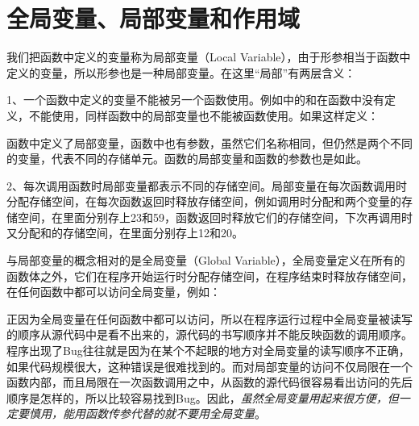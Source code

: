\section{全局变量、局部变量和作用域}
%
我们把函数中定义的变量称为局部变量（Local Variable），由于形参相当于函数中定义的变量，所以形参也是一种局部变量。在这里“局部”有两层含义：



1、一个函数中定义的变量不能被另一个函数使用。例如中的和在函数中没有定义，不能使用，同样函数中的局部变量也不能被函数使用。如果这样定义：




函数中定义了局部变量，函数中也有参数，虽然它们名称相同，但仍然是两个不同的变量，代表不同的存储单元。函数的局部变量和函数的参数也是如此。



2、每次调用函数时局部变量都表示不同的存储空间。局部变量在每次函数调用时分配存储空间，在每次函数返回时释放存储空间，例如调用时分配和两个变量的存储空间，在里面分别存上23和59，函数返回时释放它们的存储空间，下次再调用时又分配和的存储空间，在里面分别存上12和20。



与局部变量的概念相对的是全局变量（Global Variable），全局变量定义在所有的函数体之外，它们在程序开始运行时分配存储空间，在程序结束时释放存储空间，在任何函数中都可以访问全局变量，例如：





正因为全局变量在任何函数中都可以访问，所以在程序运行过程中全局变量被读写的顺序从源代码中是看不出来的，源代码的书写顺序并不能反映函数的调用顺序。程序出现了Bug往往就是因为在某个不起眼的地方对全局变量的读写顺序不正确，如果代码规模很大，这种错误是很难找到的。而对局部变量的访问不仅局限在一个函数内部，而且局限在一次函数调用之中，从函数的源代码很容易看出访问的先后顺序是怎样的，所以比较容易找到Bug。因此，\emph{虽然全局变量用起来很方便，但一定要慎用，能用函数传参代替的就不要用全局变量}。



